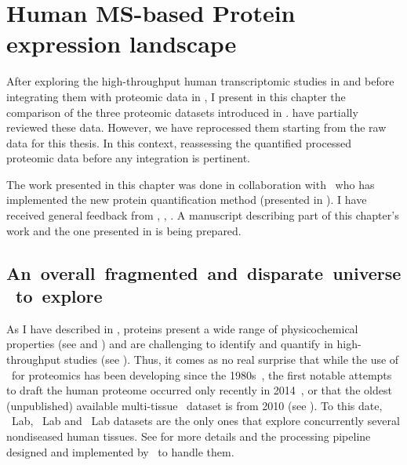 \chapter{Human MS-based Protein expression landscape}\label{ch:proteomics}

\setlength{\epigraphwidth}{0.7\textwidth}
    \setlength{\epigraphrule}{0pt}

After exploring the high-throughput human transcriptomic studies
in 
and before integrating them with proteomic data in ,
I present in this chapter the comparison of
the three proteomic datasets introduced in .
\citet{Ezkurdia2014-qx,Deutsch2015} have partially reviewed these data.
However, we have reprocessed them starting from the raw data
for this thesis.
In this context, reassessing the quantified processed proteomic data
before any integration is pertinent.\mybr\

The work presented in this chapter was done in collaboration with \james\
who has implemented the new protein quantification method
(presented in ).
I have received general feedback from \alvis, \mar,
\sarah.
A manuscript describing part of this chapter's work
and the one presented in  is being prepared.\mybr\

\section{An~overall~fragmented~and~disparate~universe~to~explore}

As I have described in ,
proteins present a wide range of physicochemical properties
(see  and )
and are challenging to identify and quantify
in high-throughput studies (see ).
Thus, it comes as no real surprise that
while the use of \ms\ for proteomics has been developing since the 1980s~,
the first notable attempts to draft the human proteome occurred only recently
in 2014~\mycite{PandeyData,KusterData},
or that the oldest (unpublished) available multi-tissue \cutler\ dataset is from 2010
(see \Cref{subsec:cutler}).
To this date,
\cutler\ Lab, \kuster\ Lab and \pandey\ Lab datasets are the only ones
that explore concurrently several nondiseased human tissues.
See  for more details and
the processing pipeline designed and implemented by \james\ to handle them.\mybr\

